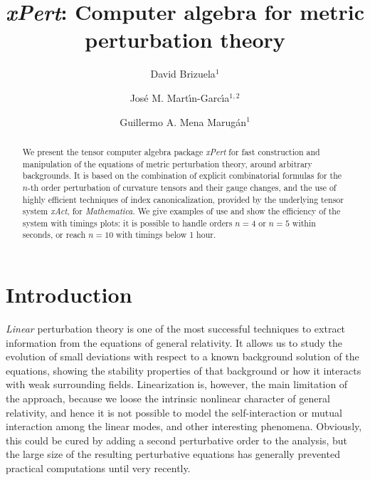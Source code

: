 \documentclass[aps,prd,showpacs]{revtex4}
\newcommand{\xPert}{{\em \lowercase{x}P\lowercase{ert}}}
\begin{document}
\title{\xPert\/: Computer algebra for metric perturbation theory}


\author{David Brizuela$^1$}
\author{Jos\'e M. Mart\'{\i}n-Garc\'{\i}a$^{1,2}$}
\author{Guillermo A. Mena Marug\'an$^1$}
%

\begin{abstract}
We present the tensor computer algebra package \xPert\/ for fast
construction and manipulation of the equations of metric perturbation
theory, around arbitrary backgrounds. It is based on the combination
of explicit combinatorial formulas for the $n$-th order perturbation
of curvature tensors and their gauge changes, and the use of highly
efficient techniques of index canonicalization, provided by the
underlying tensor system {\em xAct}, for {\em Mathematica}.
We give examples of use and show the efficiency of the system with
timings plots: it is possible to handle orders $n=4$ or $n=5$ within
seconds, or reach $n=10$ with timings below 1 hour.
\end{abstract}

\maketitle


\section{Introduction}

{\em Linear} perturbation theory is one of the most successful techniques
to extract information from the equations of general relativity.
It allows us to study the evolution of small deviations with respect to
a known background solution of the equations, showing the stability
properties of that background or how it interacts with weak surrounding
fields. Linearization is, however, the main limitation of the approach,
because we loose the intrinsic nonlinear character of general relativity,
and hence it is not possible to model the self-interaction or mutual
interaction among the linear modes, and other interesting phenomena.
Obviously, this could be cured by adding a second perturbative order to
the analysis, but the large size of the resulting perturbative equations
has generally prevented practical computations until very recently.
\end{document}
